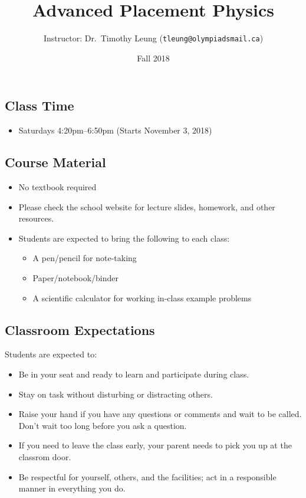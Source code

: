 \documentclass[11pt]{article}
\title{\vspace{-0.2in}\textbf{Advanced Placement Physics}}
\author{Instructor: Dr.\ Timothy Leung (\texttt{tleung@olympiadsmail.ca})}
\date{Fall 2018}
\begin{document}
\maketitle

\subsection{Class Time}
\begin{itemize}[itemsep=.1em,leftmargin=12pt]
\item Saturdays 4:20pm--6:50pm (Starts November 3, 2018)
\end{itemize}

\subsection{Course Material}
\begin{itemize}[itemsep=0pt,leftmargin=12pt]
\item No textbook required
\item Please check the school website for lecture slides, homework, and other
  resources.
\item Students are expected to bring the following to each class:
  \begin{itemize}[noitemsep,topsep=0pt]
  \item A pen/pencil for note-taking
  \item Paper/notebook/binder
  \item A scientific calculator for working in-class example problems
  \end{itemize}
\end{itemize}

\subsection{Classroom Expectations}
Students are expected to:
\begin{itemize}[itemsep=0pt,leftmargin=12pt]
\item Be in your seat and ready to learn and participate during class.
\item Stay on task without disturbing or distracting others.
\item Raise your hand if you have any questions or comments and wait to be
  called. Don't wait too long before you ask a question.
\item If you need to leave the class early, your parent needs to pick you up at
  the classrom door.
\item Be respectful for yourself, others, and the facilities; act in
  a responsible manner in everything you do.
\end{itemize}
\end{document}
